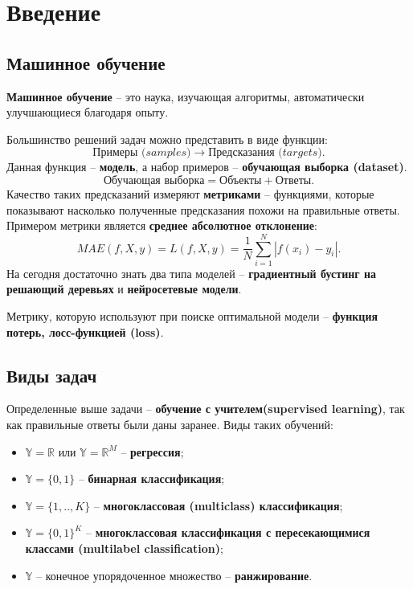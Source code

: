 \documentclass[a4paper, 10pt, openany]{book} %
\begin{document}
	
	\tableofcontents %
	
	\newpage
	
	\chapter{Введение}
	
	\section{Машинное обучение}
	
	\textbf{Машинное обучение} -- это наука, изучающая алгоритмы, автоматически улучшающиеся благодаря опыту.
	
	Большинство решений задач можно представить в виде функции:
	\begin{equation*}
		\textit{Примеры (samples)} \rightarrow \textit{Предсказания (targets)}.
	\end{equation*}
	Данная функция -- \textbf{модель}, а набор примеров -- \textbf{обучающая выборка (dataset)}.
	\begin{equation*}
		\text{Обучающая выборка} = \text{Объекты} + \text{Ответы}.
	\end{equation*}
	Качество таких предсказаний измеряют \textbf{метриками} -- функциями, которые показывают насколько полученные предсказания похожи на правильные ответы. Примером метрики является \textbf{среднее абсолютное отклонение}:
	\begin{equation*}
		MAE(f,X,y) = L(f,X,y) = \frac{1}{N}\sum_{i=1}^{N}|f(x_i) - y_i|. 
	\end{equation*}
	На сегодня достаточно знать два типа моделей -- \textbf{градиентный бустинг на решающий деревьях} и \textbf{нейросетевые модели}.
	
	Метрику, которую используют при поиске оптимальной модели -- \textbf{функция потерь, лосс-функцией (loss)}.
	
	\section{Виды задач}
	
	Определенные выше задачи -- \textbf{обучение с учителем(supervised learning)}, так как правильные ответы были даны заранее. Виды таких обучений: 
	\begin{itemize}
		\item $\mathbb{Y} = \mathbb{R}$ или $\mathbb{Y} = \mathbb{R}^M$ -- \textbf{регрессия};
		\item $\mathbb{Y} = \{0,1\}$ -- \textbf{бинарная классификация};
		\item $\mathbb{Y} = \{1,..,K\}$ -- \textbf{многоклассовая (multiclass) классификация};
		\item $\mathbb{Y} = \{0,1\}^K$ -- \textbf{многоклассовая классификация с пересекающимися классами (multilabel classification)};
		\item $\mathbb{Y}$ -- конечное упорядоченное множество -- \textbf{ранжирование}.
	\end{itemize}
	
\end{document}
